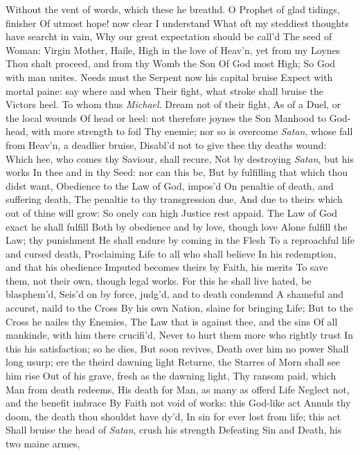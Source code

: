 \documentclass[11pt]{book}
\begin{document}
Without the vent of words, which these he breathd. 
\quad O Prophet of glad tidings, finisher 
Of utmost hope! now clear I understand 
What oft my steddiest thoughts have searcht in vain, 
Why our great expectation should be call'd 
The seed of Woman: Virgin Mother, Haile, 
High in the love of Heav'n, yet from my Loynes 
Thou shalt proceed, and from thy Womb the Son 
Of God most High; So God with man unites. 
Needs must the Serpent now his capital bruise 
Expect with mortal paine: say where and when 
Their fight, what stroke shall bruise the Victors heel. 
\quad To whom thus \textit{Michael}.  Dream not of their fight, 
As of a Duel, or the local wounds 
Of head or heel: not therefore joynes the Son 
Manhood to God-head, with more strength to foil 
Thy enemie; nor so is overcome 
\textit{Satan}, whose fall from Heav'n, a deadlier bruise, 
Disabl'd not to give thee thy deaths wound: 
Which hee, who comes thy Saviour, shall recure, 
Not by destroying \textit{Satan}, but his works 
In thee and in thy Seed: nor can this be, 
But by fulfilling that which thou didst want, 
Obedience to the Law of God, impos'd 
On penaltie of death, and suffering death, 
The penaltie to thy transgression due, 
And due to theirs which out of thine will grow: 
So onely can high Justice rest appaid. 
The Law of God exact he shall fulfill 
Both by obedience and by love, though love 
Alone fulfill the Law; thy punishment 
He shall endure by coming in the Flesh 
To a reproachful life and cursed death, 
Proclaiming Life to all who shall believe 
In his redemption, and that his obedience 
Imputed becomes theirs by Faith, his merits 
To save them, not their own, though legal works. 
For this he shall live hated, be blasphem'd, 
Seis'd on by force, judg'd, and to death condemnd 
A shameful and accurst, naild to the Cross 
By his own Nation, slaine for bringing Life; 
But to the Cross he nailes thy Enemies, 
The Law that is against thee, and the sins 
Of all mankinde, with him there crucifi'd, 
Never to hurt them more who rightly trust 
In this his satisfaction; so he dies, 
But soon revives, Death over him no power 
Shall long usurp; ere the theird dawning light 
Returne, the Starres of Morn shall see him rise 
Out of his grave, fresh as the dawning light, 
Thy ransom paid, which Man from death redeems, 
His death for Man, as many as offerd Life 
Neglect not, and the benefit imbrace 
By Faith not void of works: this God-like act 
Annuls thy doom, the death thou shouldst have dy'd, 
In sin for ever lost from life; this act 
Shall bruise the head of \textit{Satan}, crush his strength 
Defeating Sin and Death, his two maine armes, 
\end{document}
